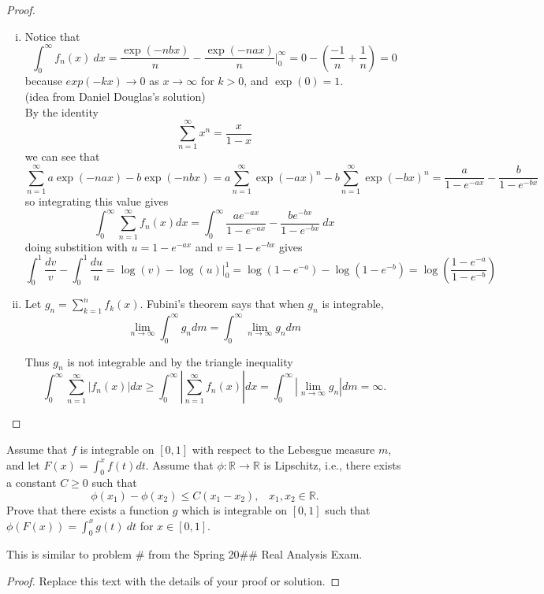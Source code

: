 \documentclass{article}
\newenvironment{problem}[2][Problem]{\begin{trivlist}
\item[\hskip \labelsep {\bfseries #1}\hskip \labelsep {\bfseries #2.}]}{\end{trivlist}}
\newenvironment{note}[1][Note.]{\begin{trivlist}
\item[\hskip \labelsep {\bfseries #1}]}{\end{trivlist}}
\begin{document}
\begin{proof}
	\begin{enumerate}[(i)]
    	\item Notice that \[
        	\int_0^\infty f_n(x)\ dx = 
            \frac{\exp(-nbx)}{n} - \frac{\exp(-nax)}{n} \Big|_{0}^{\infty} = 
            0 - \left(\frac{-1}{n} + \frac{1}{n}\right) = 
            0
        \] because $exp(-kx) \rightarrow 0$ as $x \rightarrow \infty$ for
        $k > 0$, and $\exp(0) = 1$. \\

        (idea from Daniel Douglas's solution) \\
        By the identity \[
          \sum_{n = 1}^{\infty} x^n = \frac{x}{1 - x}
        \] we can see that \[
          \sum_{n = 1}^{\infty} a\exp(-nax) - b\exp(-nbx) =
          a\sum_{n = 1}^{\infty} \exp(-ax)^n - b\sum_{n = 1}^{\infty}\exp(-bx)^n =
          \frac{a}{1 - e^{-ax}} - \frac{b}{1 - e^{-bx}}
        \] so integrating this value gives \[
          \int_{0}^{\infty} \sum_{n = 1}^{\infty} f_n(x) dx =
          \int_{0}^{\infty} \frac{ae^{-ax}}{1 - e^{-ax}} - \frac{be^{-bx}}{1 - e^{-bx}}\ dx
        \] doing substition with $u = 1 - e^{-ax}$ and $v = 1 - e^{-bx}$ gives \[
          \int_{0}^{1} \frac{dv}{v} - \int_{0}^{1} \frac{du}{u} =
          \log(v) - \log(u) \Big|_0^1 =
          \log(1 - e^{-a}) - \log(1 - e^{-b}) =
          \log\left(\frac{1 - e^{-a}}{1 - e^{-b}}\right)
        \]

        \item Let $g_n = \sum_{k = 1}^{n} f_k(x)$. Fubini's theorem says that when $g_n$ is integrable, \[
          \lim_{n \rightarrow \infty} \int_0^\infty g_n dm =
          \int_0^\infty \lim_{n \rightarrow \infty} g_n dm
        \]

        Thus $g_n $ is not integrable and by the triangle inequality \[
          \int_{0}^{\infty} \sum_{n = 1}^{\infty} \left|f_n(x)\right| dx \geq
          \int_{0}^{\infty} \left|\sum_{n = 1}^{\infty} f_n(x)\right| dx =
          \int_{0}^{\infty} \left|\lim_{n \rightarrow \infty} g_n\right| dm =
          \infty.
        \]
    \end{enumerate}
\end{proof}

\pagebreak

\begin{problem}{4} Assume that $f$ is integrable on $[0, 1]$ with respect to the Lebesgue measure $m$, and let $F(x) = \int_{0}^{x}f(t) dt$. Assume that $\phi: \mathbb{R} \rightarrow \mathbb{R}$ is Lipschitz, i.e., there exists a constant $C \geq 0$ such that \[
	\phi(x_1) - \phi(x_2) \leq C(x_1 - x_2),
    \hspace{10pt} x_1, x_2 \in \mathbb{R}.
\]
Prove that there exists a function $g$ which is integrable on $[0, 1]$ such that $\phi(F(x)) = \int_{0}^{x} g(t) \ dt$ for $x \in [0, 1]$.
\end{problem}

\begin{note} This is similar to problem \# from the Spring 20\#\# Real Analysis Exam.
\end{note}

\begin{proof}
Replace this text with the details of your proof or solution.
\end{proof}
\end{document}
